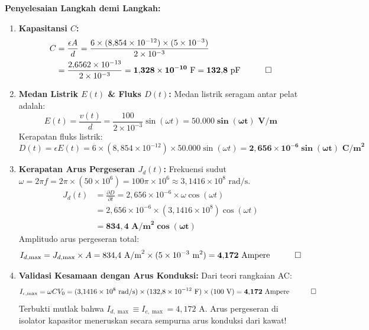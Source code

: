 \documentclass[11pt,a4paper]{article}
\theoremstyle{definition}
\begin{document}
\noindent\textbf{Penyelesaian Langkah demi Langkah:}
\begin{enumerate}[leftmargin=*]
    \item \textbf{Kapasitansi $C$:}
    \begin{align*}
        C &= \frac{\epsilon A}{d} = \frac{6 \times (8{,}854 \times 10^{-12}) \times (5 \times 10^{-3})}{2 \times 10^{-3}} \\
        &= \frac{2{,}6562 \times 10^{-13}}{2 \times 10^{-3}} = \mathbf{1{,}328 \times 10^{-10}\text{ F} = 132{,}8\text{ pF}} \quad \qed
    \end{align*}

    \item \textbf{Medan Listrik $E(t)$ \& Fluks $D(t)$:}
    Medan listrik seragam antar pelat adalah:
    \begin{equation*}
        E(t) = \frac{v(t)}{d} = \frac{100}{2 \times 10^{-3}} \sin(\omega t) = \mathbf{50.000 \sin(\omega t)\text{ V/m}}
    \end{equation*}
    Kerapatan fluks listrik:
    \begin{equation*}
        D(t) = \epsilon E(t) = 6 \times (8{,}854 \times 10^{-12}) \times 50.000 \sin(\omega t) = \mathbf{2{,}656 \times 10^{-6} \sin(\omega t)\text{ C/m}^2}
    \end{equation*}

    \item \textbf{Kerapatan Arus Pergeseran $J_d(t)$:}
    Frekuensi sudut $\omega = 2\pi f = 2\pi \times (50 \times 10^6) = 100\pi \times 10^6 \approx 3{,}1416 \times 10^8\text{ rad/s}$.
    \begin{align*}
        J_d(t) &= \frac{\partial D}{\partial t} = 2{,}656 \times 10^{-6} \times \omega \cos(\omega t) \\
        &= 2{,}656 \times 10^{-6} \times (3{,}1416 \times 10^8) \cos(\omega t) \\
        &= \mathbf{834{,}4\text{ A/m}^2 \cos(\omega t)}
    \end{align*}
    Amplitudo arus pergeseran total:
    \begin{equation*}
        I_{d,\max} = J_{d,\max} \times A = 834{,}4\text{ A/m}^2 \times (5 \times 10^{-3}\text{ m}^2) = \mathbf{4{,}172\text{ Ampere}} \quad \qed
    \end{equation*}

    \item \textbf{Validasi Kesamaan dengan Arus Konduksi:}
    Dari teori rangkaian AC:
    \begin{equation*}
        I_{c,\max} = \omega C V_0 = (3{,}1416 \times 10^8\text{ rad/s}) \times (132{,}8 \times 10^{-12}\text{ F}) \times (100\text{ V}) = \mathbf{4{,}172\text{ Ampere}} \quad \qed
    \end{equation*}
    Terbukti mutlak bahwa $I_{d,\max} \equiv I_{c,\max} = 4{,}172\text{ A}$. Arus pergeseran di isolator kapasitor meneruskan secara sempurna arus konduksi dari kawat!
\end{enumerate}
\end{document}
